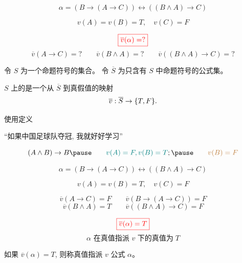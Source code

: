 \begin{frame}{}
  \[
    \alpha = (B \to (A \to C)) \leftrightarrow ((B \land A) \to C)
  \]

  \[
    v(A) = v(B) = T, \quad v(C) = F
  \]

  \pause
  \[
    \textcolor{red}{\boxed{\overline{v}(\alpha) = ?}}
  \]
  \pause
  \[
    \overline{v}(A \to C) = ?
    \qquad \overline{v}(B \land A) = ?
    \qquad \overline{v}((B \land A) \to C) = ?
  \]

  \pause
  \begin{definition}
    令 $S$ 为一个命题符号的集合。
    令 $\overline{S}$ 为只含有 $S$ 中命题符号的公式集。

    $S$ 上的是一个从 $\overline{S}$ 到真假值的映射
    \[
      \overline{v}: \overline{S} \to \{T, F\}.
    \]
  \end{definition}
\end{frame}

\begin{frame}{}
  \begin{center}
    使用定义

    \vspace{0.30cm}
    \begin{definition}
      
    \end{definition}

    \vspace{0.60cm}
    ``如果中国足球队夺冠, 我就好好学习''

    \pause
    \[
      (A \land B) \to B \pause \qquad \teal{v(A) = F, v(B) = T};
        \pause \qquad \brown{v(B) = F}
    \]
  \end{center}
\end{frame}

\begin{frame}{}
  \[
    \alpha = (B \to (A \to C)) \leftrightarrow ((B \land A) \to C)
  \]

  \[
    v(A) = v(B) = T, \quad v(C) = F
  \]

  \pause
  \[
    \overline{v}(A \to C) = F
    \qquad \overline{v}(B \to (A \to C)) = F
  \]
  \[
    \overline{v}(B \land A) = T
    \qquad \overline{v}((B \land A) \to C) = F
  \]

  \pause
  \[
    \textcolor{red}{\boxed{\overline{v}(\alpha) = T}}
  \]
  \[
    \alpha \text{ 在真值指派 $v$ 下的真值为}\; T
  \]

  \pause
  \begin{definition}[满足 (Satisfy)]
    如果 $\overline{v}(\alpha) = T$, 则称真值指派 $v$ 公式 $\alpha$。
  \end{definition}
\end{frame}

